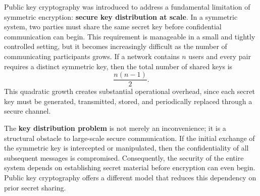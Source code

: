 Public key cryptography was introduced to address a fundamental limitation of symmetric encryption: \textbf{secure key distribution at scale}. In a symmetric system, two parties must share the same secret key before confidential communication can begin. This requirement is manageable in a small and tightly controlled setting, but it becomes increasingly difficult as the number of communicating participants grows. If a network contains $n$ users and every pair requires a distinct symmetric key, then the total number of shared keys is
\[
\frac{n(n-1)}{2}.
\]
This quadratic growth creates substantial operational overhead, since each secret key must be generated, transmitted, stored, and periodically replaced through a secure channel.

The \textbf{key distribution problem} is not merely an inconvenience; it is a structural obstacle to large-scale secure communication. If the initial exchange of the symmetric key is intercepted or manipulated, then the confidentiality of all subsequent messages is compromised. Consequently, the security of the entire system depends on establishing secret material before encryption can even begin. Public key cryptography offers a different model that reduces this dependency on prior secret sharing.

